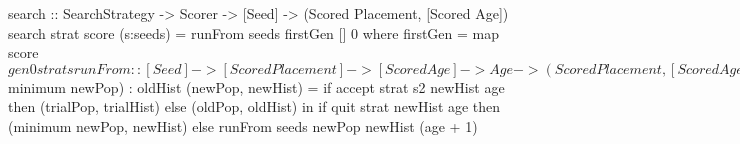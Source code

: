 search :: SearchStrategy -> Scorer -> [Seed]
       -> (Scored Placement, [Scored Age])
search strat score (s:seeds) = runFrom seeds firstGen [] 0
 where
  firstGen = map score $ gen0 strat s
  runFrom :: [Seed] -> [Scored Placement] -> [Scored Age]
          -> Age -> (Scored Placement, [Scored Age])
  runFrom (s1:s2:seeds) oldPop oldHist age =
    let trialPop  = nextGen strat s1 score oldPop
        trialHist =
          Scored age (scoreOf $ minimum newPop) : oldHist
        (newPop, newHist) =
          if accept strat s2 newHist age then
            (trialPop, trialHist)
          else
            (oldPop, oldHist)
    in  if quit strat newHist age then
          (minimum newPop, newHist)
        else
          runFrom seeds newPop newHist (age + 1)

